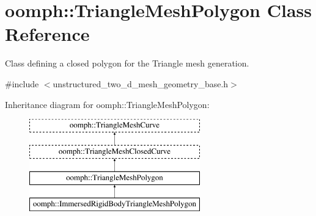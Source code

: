 \hypertarget{classoomph_1_1TriangleMeshPolygon}{}\section{oomph\+:\+:Triangle\+Mesh\+Polygon Class Reference}
\label{classoomph_1_1TriangleMeshPolygon}


Class defining a closed polygon for the Triangle mesh generation.  




{\ttfamily \#include $<$unstructured\+\_\+two\+\_\+d\+\_\+mesh\+\_\+geometry\+\_\+base.\+h$>$}

Inheritance diagram for oomph\+:\+:Triangle\+Mesh\+Polygon\+:\begin{figure}[H]
\begin{center}
\leavevmode
\includegraphics[height=4.000000cm]{classoomph_1_1TriangleMeshPolygon}
\end{center}
\end{figure}
